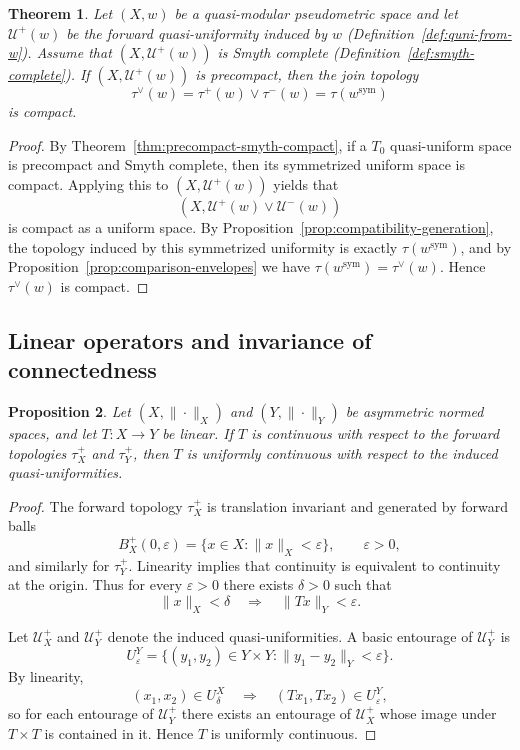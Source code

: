 \documentclass[preprint,12pt]{elsarticle}
\newtheorem{theorem}{Theorem}[section]
\newtheorem{proposition}[theorem]{Proposition}
\begin{document}
\medskip

\begin{theorem}
\label{thm:fa-compactness}
Let $(X,w)$ be a quasi-modular pseudometric space and let
$\mathcal U^{+}(w)$ be the forward quasi-uniformity induced by $w$
(Definition~\ref{def:quni-from-w}). Assume that $(X,\mathcal U^{+}(w))$
is Smyth complete (Definition~\ref{def:smyth-complete}). If
$(X,\mathcal U^{+}(w))$ is precompact, then the join topology
\[
\tau^\vee(w)=\tau^{+}(w)\vee\tau^{-}(w)=\tau(w^{\mathrm{sym}})
\]
is compact.
\end{theorem}

\begin{proof}
By Theorem~\ref{thm:precompact-smyth-compact}, if a $T_0$ quasi-uniform
space is precompact and Smyth complete, then its symmetrized uniform
space is compact. Applying this to $(X,\mathcal U^{+}(w))$ yields that
\[
(X,\mathcal U^{+}(w)\vee\mathcal U^{-}(w))
\]
is compact as a uniform space. By
Proposition~\ref{prop:compatibility-generation}, the topology induced by
this symmetrized uniformity is exactly $\tau(w^{\mathrm{sym}})$, and by
Proposition~\ref{prop:comparison-envelopes} we have
$\tau(w^{\mathrm{sym}})=\tau^\vee(w)$. Hence $\tau^\vee(w)$ is compact.
\end{proof}

\subsection{Linear operators and invariance of connectedness}
\label{ssec:fa-operators}

\begin{proposition}
\label{prop:fa-linear-continuity}
Let $(X,\|\cdot\|_X)$ and $(Y,\|\cdot\|_Y)$ be asymmetric normed spaces,
and let $T:X\to Y$ be linear. If $T$ is continuous with respect to the
forward topologies $\tau_X^{+}$ and $\tau_Y^{+}$, then $T$ is uniformly
continuous with respect to the induced quasi-uniformities.
\end{proposition}

\begin{proof}
The forward topology $\tau_X^{+}$ is translation invariant and generated
by forward balls
\[
B_X^{+}(0,\varepsilon)=\{x\in X:\|x\|_X<\varepsilon\},
\qquad \varepsilon>0,
\]
and similarly for $\tau_Y^{+}$. Linearity implies that continuity is
equivalent to continuity at the origin. Thus for every $\varepsilon>0$
there exists $\delta>0$ such that
\[
\|x\|_X<\delta \quad\Longrightarrow\quad \|Tx\|_Y<\varepsilon.
\]

Let $\mathcal U_X^{+}$ and $\mathcal U_Y^{+}$ denote the induced
quasi-uniformities. A basic entourage of $\mathcal U_Y^{+}$ is
\[
U_\varepsilon^Y=\{(y_1,y_2)\in Y\times Y:\|y_1-y_2\|_Y<\varepsilon\}.
\]
By linearity,
\[
(x_1,x_2)\in U_\delta^X
\quad\Longrightarrow\quad
(Tx_1,Tx_2)\in U_\varepsilon^Y,
\]
so for each entourage of $\mathcal U_Y^{+}$ there exists an entourage of
$\mathcal U_X^{+}$ whose image under $T\times T$ is contained in it.
Hence $T$ is uniformly continuous.
\end{proof}
\end{document}
